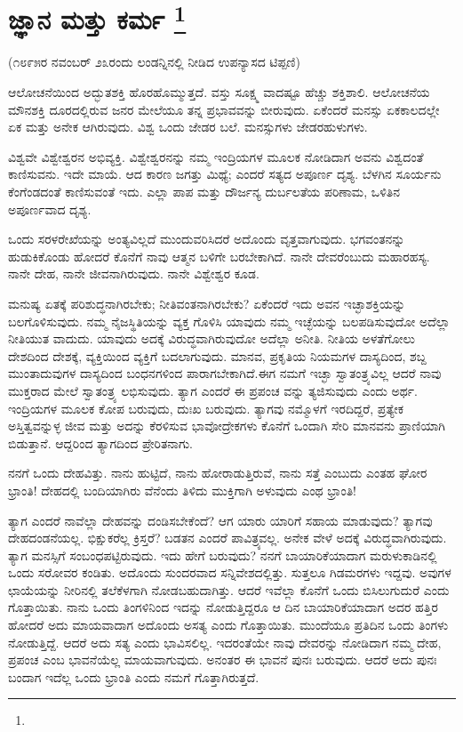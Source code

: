 
\chapter[ಜ್ಞಾನ ಮತ್ತು ಕರ್ಮ ]{ಜ್ಞಾನ ಮತ್ತು ಕರ್ಮ \protect\footnote{}}

\centerline{(೧೮೯೫ರ ನವಂಬರ್​ ೨೩ರಂದು ಲಂಡನ್ನಿನಲ್ಲಿ ನೀಡಿದ ಉಪನ್ಯಾಸದ ಟಿಪ್ಪಣಿ)}

ಆಲೋಚನೆಯಿಂದ ಅದ್ಭುತಶಕ್ತಿ ಹೊರಹೊಮ್ಮುತ್ತದೆ. ವಸ್ತು ಸೂಕ್ಷ್ಮ ವಾದಷ್ಟೂ ಹೆಚ್ಚು ಶಕ್ತಿಶಾಲಿ. ಆಲೋಚನೆಯ ಮೌನಶಕ್ತಿ ದೂರದಲ್ಲಿರುವ ಜನರ ಮೇಲೆಯೂ ತನ್ನ ಪ್ರಭಾವವನ್ನು ಬೀರುವುದು. ಏಕೆಂದರೆ ಮನಸ್ಸು ಏಕಕಾಲದಲ್ಲೇ ಏಕ ಮತ್ತು ಅನೇಕ ಆಗಿರುವುದು. ವಿಶ್ವ ಒಂದು ಜೇಡರ ಬಲೆ. ಮನಸ್ಸುಗಳು ಜೇಡರಹುಳುಗಳು.

ವಿಶ್ವವೇ ವಿಶ್ವೇಶ್ವರನ ಅಭಿವ್ಯಕ್ತಿ. ವಿಶ್ವೇಶ್ವರನನ್ನು ನಮ್ಮ ಇಂದ್ರಿಯಗಳ ಮೂಲಕ ನೋಡಿದಾಗ ಅವನು ವಿಶ್ವದಂತೆ ಕಾಣಿಸುವನು. ಇದೇ ಮಾಯೆ. ಆದ ಕಾರಣ ಜಗತ್ತು ಮಿಥ್ಯೆ; ಎಂದರೆ ಸತ್ಯದ ಅಪೂರ್ಣ ದೃಶ್ಯ. ಬೆಳಗಿನ ಸೂರ್ಯನು ಕೆಂಗೆಂಡದಂತೆ ಕಾಣಿಸುವಂತೆ ಇದು. ಎಲ್ಲಾ ಪಾಪ ಮತ್ತು ದೌರ್ಜನ್ಯ ದುರ್ಬಲತೆಯ ಪರಿಣಾಮ, ಒಳಿತಿನ ಅಪೂರ್ಣವಾದ ದೃಶ್ಯ.

ಒಂದು ಸರಳರೇಖೆಯನ್ನು ಅಂತ್ಯವಿಲ್ಲದೆ ಮುಂದುವರಿಸಿದರೆ ಅದೊಂದು ವೃತ್ತವಾಗುವುದು. ಭಗವಂತನನ್ನು ಹುಡುಕಿಕೊಂಡು ಹೋದರೆ ಕೊನೆಗೆ ನಾವು ಆತ್ಮನ ಬಳಿಗೇ ಬರಬೇಕಾಗಿದೆ. ನಾನೇ ದೇವರೆಂಬುದು ಮಹಾರಹಸ್ಯ. ನಾನೇ ದೇಹ, ನಾನೇ ಜೀವನಾಗಿರುವುದು. ನಾನೇ ವಿಶ್ವೇಶ್ವರ ಕೂಡ.

ಮನುಷ್ಯ ಏತಕ್ಕೆ ಪರಿಶುದ್ಧನಾಗಿರಬೇಕು; ನೀತಿವಂತನಾಗಿರಬೇಕು? ಏಕೆಂದರೆ ಇದು ಅವನ ಇಚ್ಛಾಶಕ್ತಿಯನ್ನು ಬಲಗೊಳಿಸುವುದು. ನಮ್ಮ ನೈಜಸ್ಥಿತಿಯನ್ನು ವ್ಯಕ್ತ ಗೊಳಿಸಿ ಯಾವುದು ನಮ್ಮ ಇಚ್ಛೆಯನ್ನು ಬಲಪಡಿಸುವುದೋ ಅದೆಲ್ಲಾ ನೀತಿಯುತ ವಾದುದು. ಯಾವುದು ಅದಕ್ಕೆ ವಿರುದ್ಧವಾಗಿರುವುದೋ ಅದೆಲ್ಲಾ ಅನೀತಿ. ನೀತಿಯ ಅಳತೆಗೋಲು ದೇಶದಿಂದ ದೇಶಕ್ಕೆ, ವ್ಯಕ್ತಿಯಿಂದ ವ್ಯಕ್ತಿಗೆ ಬದಲಾಗುವುದು. ಮಾನವ, ಪ್ರಕೃತಿಯ ನಿಯಮಗಳ ದಾಸ್ಯದಿಂದ, ಶಬ್ದ ಮುಂತಾದುವುಗಳ ದಾಸ್ಯದಿಂದ ಬಂಧನಗಳಿಂದ ಪಾರಾಗಬೇಕಾಗಿದೆ.ಈಗ ನಮಗೆ ಇಚ್ಛಾ ಸ್ವಾತಂತ್ರ್ಯವಿಲ್ಲ ಆದರೆ ನಾವು ಮುಕ್ತರಾದ ಮೇಲೆ ಸ್ವಾತಂತ್ರ್ಯ ಲಭಿಸುವುದು. ತ್ಯಾಗ ಎಂದರೆ ಈ ಪ್ರಪಂಚ ವನ್ನು ತ್ಯಜಿಸುವುದು ಎಂದು ಅರ್ಥ. ಇಂದ್ರಿಯಗಳ ಮೂಲಕ ಕೋಪ ಬರುವುದು, ದುಃಖ ಬರುವುದು. ತ್ಯಾಗವು ನಮ್ಮೊಳಗೆ ಇರದಿದ್ದರೆ, ಪ್ರತ್ಯೇಕ ಅಸ್ತಿತ್ವವನ್ನುಳ್ಳ ಜೀವ ಮತ್ತು ಅದನ್ನು ಕೆರಳಿಸುವ ಭಾವೋದ್ರೇಕಗಳು ಕೊನೆಗೆ ಒಂದಾಗಿ ಸೇರಿ ಮಾನವನು ಪ್ರಾಣಿಯಾಗಿ ಬಿಡುತ್ತಾನೆ. ಆದ್ದರಿಂದ ತ್ಯಾಗದಿಂದ ಪ್ರೇರಿತನಾಗು.

ನನಗೆ ಒಂದು ದೇಹವಿತ್ತು. ನಾನು ಹುಟ್ಟಿದೆ, ನಾನು ಹೋರಾಡುತ್ತಿರುವೆ, ನಾನು ಸತ್ತೆ ಎಂಬುದು ಎಂತಹ ಘೋರ ಭ್ರಾಂತಿ! ದೇಹದಲ್ಲಿ ಬಂದಿಯಾಗಿರು ವೆನೆಂದು ತಿಳಿದು ಮುಕ್ತಿಗಾಗಿ ಅಳುವುದು ಎಂಥ ಭ್ರಾಂತಿ!

ತ್ಯಾಗ ಎಂದರೆ ನಾವೆಲ್ಲಾ ದೇಹವನ್ನು ದಂಡಿಸಬೇಕೆಂದೆ? ಆಗ ಯಾರು ಯಾರಿಗೆ ಸಹಾಯ ಮಾಡುವುದು? ತ್ಯಾಗವು ದೇಹದಂಡನೆಯಲ್ಲ. ಭಿಕ್ಷುಕರೆಲ್ಲ ಕ್ರಿಸ್ತರೆ? ಬಡತನ ಎಂದರೆ ಪಾವಿತ್ರ್ಯವಲ್ಲ. ಅನೇಕ ವೇಳೆ ಅದಕ್ಕೆ ವಿರುದ್ಧವಾಗಿರುವುದು. ತ್ಯಾಗ ಮನಸ್ಸಿಗೆ ಸಂಬಂಧಪಟ್ಟಿರುವುದು. ಇದು ಹೇಗೆ ಬರುವುದು? ನನಗೆ ಬಾಯಾರಿಕೆಯಾದಾಗ ಮರುಳುಕಾಡಿನಲ್ಲಿ ಒಂದು ಸರೋವರ ಕಂಡಿತು. ಅದೊಂದು ಸುಂದರವಾದ ಸನ್ನಿವೇಶದಲ್ಲಿತ್ತು. ಸುತ್ತಲೂ ಗಿಡಮರಗಳು ಇದ್ದವು. ಅವುಗಳ ಛಾಯೆಯನ್ನು ನೀರಿನಲ್ಲಿ ತಲೆಕೆಳಗಾಗಿ ನೋಡಬಹುದಾಗಿತ್ತು. ಆದರೆ ಇವೆಲ್ಲಾ ಕೊನೆಗೆ ಒಂದು ಬಿಸಿಲುಗುದುರೆ ಎಂದು ಗೊತ್ತಾಯಿತು. ನಾನು ಒಂದು ತಿಂಗಳಿನಿಂದ ಇದನ್ನು ನೋಡುತ್ತಿದ್ದರೂ ಆ ದಿನ ಬಾಯಾರಿಕೆಯಾದಾಗ ಅದರ ಹತ್ತಿರ ಹೋದರೆ ಅದು ಮಾಯವಾದಾಗ ಅದೊಂದು ಅಸತ್ಯ ಎಂದು ಗೊತ್ತಾಯಿತು. ಮುಂದೆಯೂ ಪ್ರತಿದಿನ ಒಂದು ತಿಂಗಳು ನೋಡುತ್ತಿದ್ದೆ. ಆದರೆ ಅದು ಸತ್ಯ ಎಂದು ಭಾವಿಸಲಿಲ್ಲ. ಇದರಂತೆಯೇ ನಾವು ದೇವರನ್ನು ನೋಡಿದಾಗ ನಮ್ಮ ದೇಹ, ಪ್ರಪಂಚ ಎಂಬ ಭಾವನೆಯೆಲ್ಲ ಮಾಯವಾಗುವುದು. ಅನಂತರ ಈ ಭಾವನೆ ಪುನಃ ಬರುವುದು. ಆದರೆ ಅದು ಪುನಃ ಬಂದಾಗ ಇದೆಲ್ಲ ಒಂದು ಭ್ರಾಂತಿ ಎಂದು ನಮಗೆ ಗೊತ್ತಾಗಿರುತ್ತದೆ.

